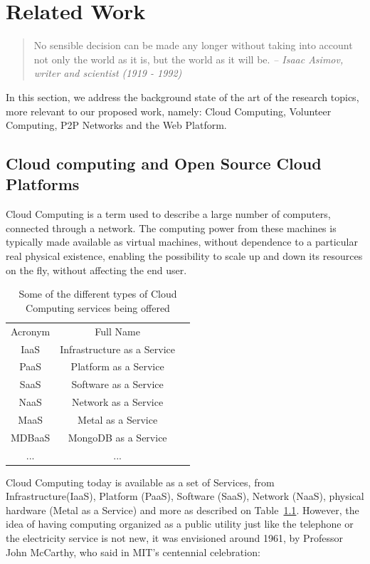 \chapter{Related Work}\label{ch:relatedwork}

\begin{quotation}
No sensible decision can be made any longer without taking into account not only the world as it is, but the world as it will be.
{\small\it -- Isaac Asimov, writer and scientist (1919 - 1992)}
\end{quotation}

In this section, we address the background state of the art of the research topics, more relevant to our proposed work, namely: Cloud Computing, Volunteer Computing, P2P Networks and the Web Platform.

% 
% 
\section{Cloud computing and Open Source Cloud Platforms}

Cloud Computing is a term used to describe a large number of computers, connected through a network. The computing power from these machines is typically made available as virtual machines, without dependence to a particular real physical existence, enabling the possibility to scale up and down its resources on the fly, without affecting the end user.

\begin{table}
  \centering
  \begin{tabular}{| c | c | c |}
  \hline 
  Acronym & Full Name  \\
  IaaS & Infrastructure as a Service \\
  PaaS & Platform as a Service \\
  SaaS & Software as a Service \\
  NaaS & Network as a Service \\
  MaaS & Metal as a Service \\
  MDBaaS & MongoDB as a Service \\
  ... & ... \\
  \hline   
  \end{tabular}
  \caption{Some of the different types of Cloud Computing services being offered}
  \label{tbl:aastypes}
\end{table}

Cloud Computing today is available as a set of Services, from Infrastructure(IaaS), Platform (PaaS), Software (SaaS), Network (NaaS), physical hardware (Metal as a Service) and more as described on Table~\ref{tbl:aastypes}. However, the idea of having computing organized as a public utility just like the telephone or the electricity service is not new, it was envisioned around 1961, by Professor John McCarthy, who said in MIT's centennial celebration:


